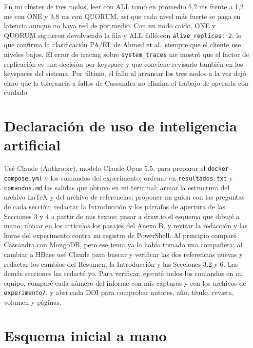 \documentclass[12pt,a4paper]{article}
\begin{document}
En mi clúster de tres nodos, leer con ALL tomó en promedio 5,2 ms frente a 1,2 ms con ONE y 3,8 ms con QUORUM, así que cada nivel más fuerte se paga en latencia aunque no haya red de por medio. Con un nodo caído, ONE y QUORUM siguieron devolviendo la fila y ALL falló con \texttt{alive\_replicas: 2}, lo que confirma la clasificación PA/EL de Ahmed et al.\ siempre que el cliente use niveles bajos. El error de tracing sobre \texttt{system\_traces} me mostró que el factor de replicación es una decisión por keyspace y que conviene revisarlo también en los keyspaces del sistema. Por último, el fallo al arrancar los tres nodos a la vez dejó claro que la tolerancia a fallos de Cassandra no elimina el trabajo de operarla con cuidado.

\section*{Declaración de uso de inteligencia artificial}

Usé Claude (Anthropic), modelo Claude Opus 5.5, para preparar el \texttt{docker-compose.yml} y los comandos del experimento; ordenar en \texttt{resultados.txt} y \texttt{comandos.md} las salidas que obtuve en mi terminal; armar la estructura del archivo \LaTeX{} y del archivo de referencias; proponer un guion con las preguntas de cada sección; redactar la Introducción y los párrafos de apertura de las Secciones 3 y 4 a partir de mis textos; pasar a draw.io el esquema que dibujé a mano; ubicar en los artículos los pasajes del Anexo B, y revisar la redacción y las horas del experimento contra mi registro de PowerShell. Al principio comparé Cassandra con MongoDB, pero ese tema ya lo había tomado una compañera; al cambiar a HBase usé Claude para buscar y verificar las dos referencias nuevas y redactar los cambios del Resumen, la Introducción y las Secciones 3.2 y 6. Las demás secciones las redacté yo. Para verificar, ejecuté todos los comandos en mi equipo, comparé cada número del informe con mis capturas y con los archivos de \texttt{experimento/}, y abrí cada DOI para comprobar autores, año, título, revista, volumen y páginas.
\newpage
\printbibliography[title={Referencias}]
\newpage
\appendix
\section{Esquema inicial a mano}
\end{document}
